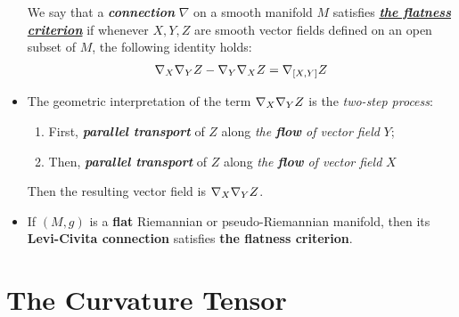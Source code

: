 \documentclass[11pt]{article}
\begin{document}
\begin{itemize}
\begin{remark}
We say that a \emph{\textbf{connection}} $\nabla$ on a smooth manifold $M$ satisfies \underline{\emph{\textbf{the flatness criterion}}} if whenever $X, Y, Z$ are smooth vector fields defined on an open subset of $M$, the following identity holds:
\begin{align}
\nabla_{X}{\nabla_{Y}{Z}} - \nabla_{Y}{\nabla_{X}{Z}}  = \nabla_{[X, Y]}{Z} \label{eqn: flatness_criterion}
\end{align}
\end{remark}

\item \begin{remark}
The geometric interpretation of the term $\nabla_{X}{\nabla_{Y}{Z}}$ is the \emph{two-step process}:
\begin{enumerate}
\item First, \emph{\textbf{parallel transport}} of $Z$ along \emph{the \textbf{flow} of vector field} $Y$;
\item Then, \emph{\textbf{parallel transport}} of $Z$ along \emph{the \textbf{flow} of vector field} $X$
\end{enumerate} Then the resulting vector field is $\nabla_{X}{\nabla_{Y}{Z}}$.
\end{remark}

\item \begin{proposition}
If $(M,g)$ is a \textbf{flat} Riemannian or pseudo-Riemannian manifold, then its \textbf{Levi-Civita connection} satisfies \textbf{the flatness criterion}.
\end{proposition}
\end{itemize}

\section{The Curvature Tensor}
\end{document}

